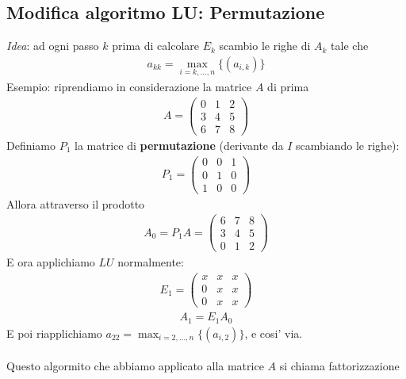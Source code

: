 \documentclass[a4paper,12pt]{article}
\begin{document}
\subsection*{Modifica algoritmo LU: Permutazione}
\textit{Idea}: ad ogni passo $k$ prima di calcolare $E_k$ scambio le righe di $A_k$ tale che
\begin{align*}
    a_{kk} = \max_{i=k,\dots,n} \{(a_{i, k})\}
\end{align*}
Esempio: riprendiamo in considerazione la matrice $A$ di prima
\begin{align*}
        A =\begin{pmatrix}
        0 & 1 & 2 \\
        3 & 4 & 5 \\
        6 & 7 & 8
    \end{pmatrix}
\end{align*}
Definiamo $P_1$ la matrice di \textbf{permutazione} (derivante da $I$ scambiando le righe):
\begin{align*}
    P_1 = \begin{pmatrix}
        0 & 0 & 1 \\
        0 & 1 & 0 \\
        1 & 0 & 0
    \end{pmatrix}
\end{align*}
Allora attraverso il prodotto
\begin{align*}
    A_0 = P_1 A = \begin{pmatrix}
        6 & 7 & 8 \\
        3 & 4 & 5 \\
        0 & 1 & 2
    \end{pmatrix}
\end{align*}
E ora applichiamo $LU$ normalmente:
\begin{align*}
    E_1 = \begin{pmatrix}
        x & x & x \\
        0 & x & x \\
        0 & x & x
    \end{pmatrix}
\end{align*}
\begin{align*}
    A_1 = E_1 A_0
\end{align*}
E poi riapplichiamo $a_{22} = \max_{i=2,\dots,n} \{(a_{i, 2})\}$, e cosi' via. \\
\vspace{5px} \\
Questo algormito che abbiamo applicato alla matrice $A$ si chiama fattorizzazione 
\end{document}
